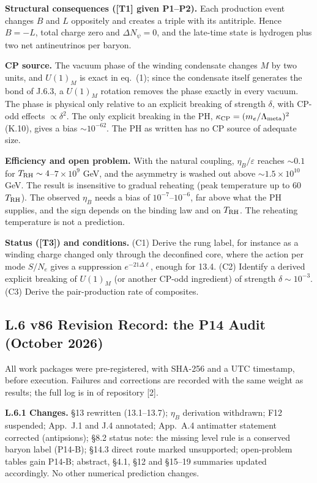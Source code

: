 \noindent \textbf{Structural consequences ([T1] given P1--P2). }Each production event changes $B$ and $L$ oppositely and creates a triple with its antitriple. Hence $B=-L$, total charge zero and $\Delta N_\psi=0$, and the late-time state is hydrogen plus two net antineutrinos per baryon.

\noindent \textbf{CP source. }The vacuum phase of the winding condensate changes $M$ by two units, and $U(1)_M$ is exact in eq.~(1); since the condensate itself generates the bond of J.6.3, a $U(1)_M$ rotation removes the phase exactly in every vacuum. The phase is physical only relative to an explicit breaking of strength $\delta$, with CP-odd effects $\propto\delta^2$. The only explicit breaking in the PH, $\kappa_{\rm CP}=(m_e/\Lambda_{\rm meta})^2$ (K.10), gives a bias $\sim10^{-62}$. The PH as written has no CP source of adequate size.

\noindent \textbf{Efficiency and open problem. }With the natural coupling, $\eta_B/\varepsilon$ reaches $\sim0.1$ for $T_{\rm RH}\sim4$--$7\times10^9$ GeV, and the asymmetry is washed out above $\sim1.5\times10^{10}$ GeV. The result is insensitive to gradual reheating (peak temperature up to 60 $T_{\rm RH}$). The observed $\eta_B$ needs a bias of $10^{-7}$--$10^{-6}$, far above what the PH supplies, and the sign depends on the binding law and on $T_{\rm RH}$. The reheating temperature is not a prediction.

\noindent \textbf{Status ([T3]) and conditions. }(C1) Derive the rung label, for instance as a winding charge changed only through the deconfined core, where the action per mode $S/N_e$ gives a suppression $e^{-21\Delta\ell}$, enough for 13.4. (C2) Identify a derived explicit breaking of $U(1)_M$ (or another CP-odd ingredient) of strength $\delta\sim10^{-3}$. (C3) Derive the pair-production rate of composites.
\subsection*{L.6  v86 Revision Record: the P14 Audit (October 2026)}

\noindent All work packages were pre-registered, with SHA-256 and a UTC timestamp, before execution. Failures and corrections are recorded with the same weight as results; the full log is in  of repository [2].

\noindent \textbf{L.6.1 Changes. }§13 rewritten (13.1--13.7); $\eta_B$ derivation withdrawn; F12 suspended; App.~J.1 and J.4 annotated; App.~A.4 antimatter statement corrected (antipsions); §8.2 status note: the missing level rule is a conserved baryon label (P14-B); §14.3 direct route marked unsupported; open-problem tables gain P14-B; abstract, §4.1, §12 and §15--19 summaries updated accordingly. No other numerical prediction changes.

